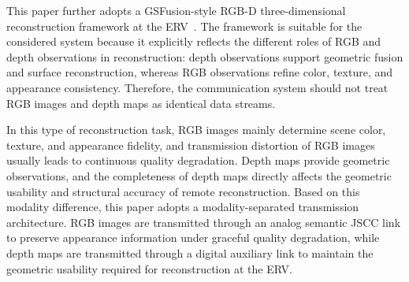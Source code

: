 \documentclass[journal]{IEEEtran}
\begin{document}
This paper further adopts a GSFusion-style RGB-D three-dimensional reconstruction framework at the ERV~\cite{A12}. 
The framework is suitable for the considered system because it explicitly reflects the different roles of RGB and depth observations in reconstruction: depth observations support geometric fusion and surface reconstruction, whereas RGB observations refine color, texture, and appearance consistency. 
Therefore, the communication system should not treat RGB images and depth maps as identical data streams.

In this type of reconstruction task, RGB images mainly determine scene color, texture, and appearance fidelity, and transmission distortion of RGB images usually leads to continuous quality degradation. 
Depth maps provide geometric observations, and the completeness of depth maps directly affects the geometric usability and structural accuracy of remote reconstruction. 
Based on this modality difference, this paper adopts a modality-separated transmission architecture. 
RGB images are transmitted through an analog semantic JSCC link to preserve appearance information under graceful quality degradation, while depth maps are transmitted through a digital auxiliary link to maintain the geometric usability required for reconstruction at the ERV.
\end{document}
